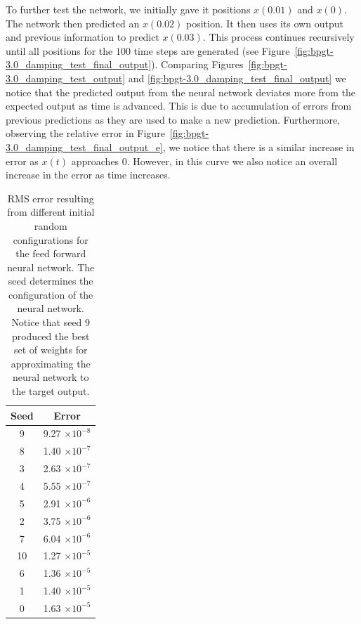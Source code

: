 \documentclass[11pt]{article}
\begin{document}
To further test the network, we initially gave it positions $x(0.01)$ and $x(0)$. The network then predicted an $x(0.02)$ position. It
then uses its own output and previous information to predict $x(0.03)$. This process continues recursively until all positions for the
$100$ time steps are generated (see Figure~\ref{fig:bpgt-3.0_damping_test_final_output}). Comparing
Figures~\ref{fig:bpgt-3.0_damping_test_output} and \ref{fig:bpgt-3.0_damping_test_final_output} we notice that the predicted output from
the neural network deviates more from the expected output as time is advanced. This is due to accumulation of errors from previous
predictions as they are used to make a new prediction. Furthermore, observing the relative error in
Figure~\ref{fig:bpgt-3.0_damping_test_final_output_e}, we notice that there is a similar increase in error as $x(t)$ approaches $0$.
However, in this curve we also notice an overall increase in the error as time increases.

\begin{table}
	\begin{center}
		\begin{tabular}{|c|c|}
		\hline
		Seed & Error\\
		\hline
		9 & 9.27 $\times 10^{-8}$\\
		8 & 1.40 $\times 10^{-7}$\\
		3 & 2.63 $\times 10^{-7}$\\
		4 & 5.55 $\times 10^{-7}$\\
		5 & 2.91 $\times 10^{-6}$\\
		2 & 3.75 $\times 10^{-6}$\\
		7 & 6.04 $\times 10^{-6}$\\
		10 & 1.27 $\times 10^{-5}$\\
		6 & 1.36 $\times 10^{-5}$\\
		1 & 1.40 $\times 10^{-5}$\\
		0 & 1.63 $\times 10^{-5}$\\
		\hline
		\end{tabular}
	\end{center}
	\caption{RMS error resulting from different initial random configurations for the feed forward neural network. The seed determines the configuration of the neural network. Notice that seed $9$ produced the best set of weights for approximating the neural network to the target output.}
	\label{tab:training_seeds}
\end{table}
\end{document}
